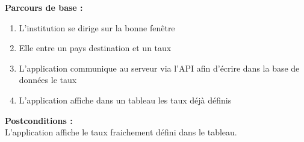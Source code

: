 \documentclass[../annexe.tex]{subfiles}
\begin{document}
\textbf{Parcours de base :} \\
\begin{enumerate}
    \item L'institution se dirige sur la bonne fenêtre
    \item Elle entre un pays destination et un taux
    \item L'application communique au serveur via l'API afin d'écrire dans la base de données le taux
    \item L'application affiche dans un tableau les taux déjà définis
\end{enumerate}
\bigskip

\textbf{Postconditions :} \\
L'application affiche le taux fraichement défini dans le tableau. \\
\end{document}
